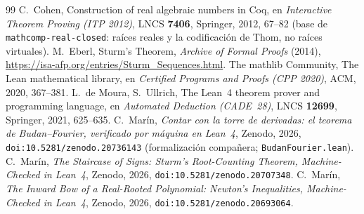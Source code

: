 \documentclass[11pt]{article}
\newcommand{\lean}[1]{\texttt{#1}}
\begin{document}
\begin{thebibliography}{99}
 C.~Cohen, Construction of real algebraic numbers in Coq, en \emph{Interactive Theorem
Proving (ITP 2012)}, LNCS \textbf{7406}, Springer, 2012, 67--82 (base de \lean{mathcomp-real-closed}:
ra\'ices reales y la codificaci\'on de Thom, no ra\'ices virtuales).
 M.~Eberl, Sturm's Theorem, \emph{Archive of Formal Proofs} (2014),
\url{https://isa-afp.org/entries/Sturm_Sequences.html}.
 The mathlib Community, The Lean mathematical library, en \emph{Certified Programs and
Proofs (CPP 2020)}, ACM, 2020, 367--381.
 L.~de Moura, S.~Ullrich, The Lean~4 theorem prover and programming language, en
\emph{Automated Deduction (CADE~28)}, LNCS \textbf{12699}, Springer, 2021, 625--635.
 C.~Mar\'in, \emph{Contar con la torre de derivadas: el teorema de Budan--Fourier,
verificado por m\'aquina en Lean~4}, Zenodo, 2026, \texttt{doi:10.5281/zenodo.20736143}
(formalizaci\'on compa\~nera; \lean{BudanFourier.lean}).
 C.~Mar\'in, \emph{The Staircase of Signs: Sturm's Root-Counting Theorem,
Machine-Checked in Lean~4}, Zenodo, 2026, \texttt{doi:10.5281/zenodo.20707348}.
 C.~Mar\'in, \emph{The Inward Bow of a Real-Rooted Polynomial: Newton's Inequalities,
Machine-Checked in Lean~4}, Zenodo, 2026, \texttt{doi:10.5281/zenodo.20693064}.
\end{thebibliography}
\end{document}
